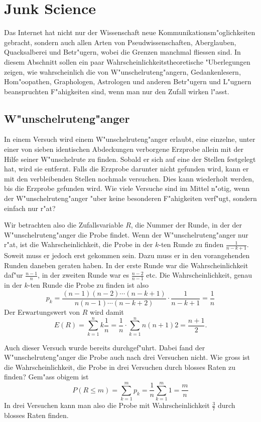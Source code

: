 %
%
%
\chapter{Junk Science}
Das Internet hat nicht nur der Wissenschaft neue Kommunikationsm"oglichkeiten
gebracht, sondern auch allen Arten von Pseudwissenschaften,
Aberglauben, Quacksalberei und Betr"ugern, wobei die Grenzen manchmal
fliessen sind.
In diesem Abschnitt sollen ein paar Wahrscheinlichkeitstheoretische
"Uberlegungen zeigen, wie wahrscheinlich die von W"unschelruteng"angern,
Gedankenlesern, Hom"oo\-pathen, Graphologen, Astrologen und anderen Betr"ugern
und L"ugnern beanspruchten F"ahigkeiten sind, wenn man nur den Zufall wirken
l"asst.

\section{W"unschelruteng"anger}
In einem Versuch wird einem W"unschelruteng"anger erlaubt, eine einzelne,
unter einer von sieben identischen Abdeckungen verborgene Erzprobe allein
mit der Hilfe seiner W"unschelrute zu finden.
Sobald er sich auf eine
der Stellen festgelegt hat, wird sie entfernt.
Falls die Erzprobe darunter
nicht gefunden wird, kann er mit den verbleibenden Stellen nochmals
versuchen.
Dies kann wiederholt werden, bis die Erzprobe gefunden wird.
Wie viele Versuche sind im Mittel n"otig, wenn der W"unschelruteng"anger
"uber keine besonderen F"ahigkeiten verf"ugt, sondern einfach nur r"at?

Wir betrachten also die Zufallsvariable $R$, die Nummer der Runde, in der
der W"unschelruteng"anger die Probe findet.
Wenn der W"unschelruteng"anger
nur r"at, ist die Wahrscheinlichkeit, die Probe in der $k$-ten Runde zu finden
$\frac1{n-k+1}$.
Soweit muss er jedoch erst gekommen sein.
Dazu muss er in
den vorangehenden Runden daneben geraten haben.
In der erste
Runde war die Wahrscheinlichkeit daf"ur $\frac{n-1}n$, in der zweiten
Runde war es $\frac{n-2}{n-1}$ etc.
Die Wahrscheinlichkeit, genau in der
$k$-ten Runde die Probe zu finden ist also
\[
p_k=\frac{(n-1)(n-2)\cdots (n-k+1)}{n(n-1)\cdots(n-k+2)}\cdot\frac1{n-k+1}=\frac1n
\]
Der Erwartungswert von $R$ wird damit
\[
E(R)=\sum_{k=1}^nk\frac1n=\frac1n\cdot\sum_{k=1}^n{n(n+1)}2=\frac{n+1}2.
\]

Auch dieser Versuch wurde bereits durchgef"uhrt.
Dabei fand der W"unschelruteng"anger
die Probe auch nach drei Versuchen nicht.
Wie gross ist die Wahrscheinlichkeit,
die Probe in drei Versuchen durch blosses Raten zu finden? Gem"ass obigem ist
$$P(R\le m)= \sum_{k=1}^mp_k=\frac1n\sum_{k=1}^m1=\frac{m}{n}$$
In drei Versuchen kann man also die Probe mit Wahrscheinlichkeit $\frac37$ durch
blosses Raten finden.

